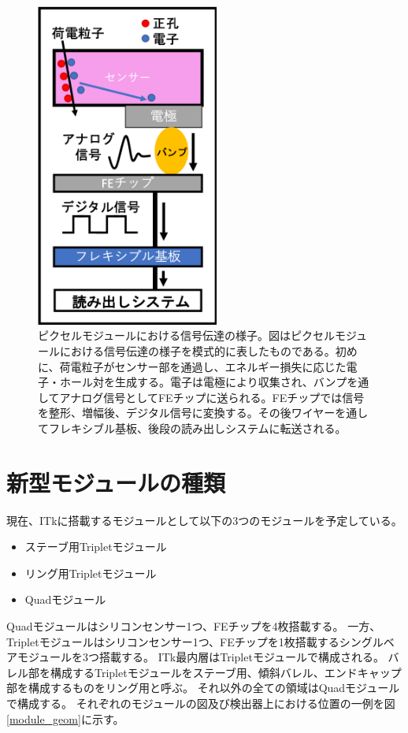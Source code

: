 \begin{figure}[bpt]\centering
\includegraphics[width=6cm]{./module_electric_overview.png}
\caption[ピクセルモジュールにおける信号伝達の様子]{ピクセルモジュールにおける信号伝達の様子。図はピクセルモジュールにおける信号伝達の様子を模式的に表したものである。初めに、荷電粒子がセンサー部を通過し、エネルギー損失に応じた電子・ホール対を生成する。電子は電極により収集され、バンプを通してアナログ信号としてFEチップに送られる。FEチップでは信号を整形、増幅後、デジタル信号に変換する。その後ワイヤーを通してフレキシブル基板、後段の読み出しシステムに転送される。}
\label{module_electric_overview}
\end{figure}

\clearpage
\section{新型モジュールの種類}
現在、ITkに搭載するモジュールとして以下の3つのモジュールを予定している。
\begin{itemize}
  \item ステーブ用Tripletモジュール
  \item リング用Tripletモジュール
  \item Quadモジュール
\end{itemize}

Quadモジュールはシリコンセンサー1つ、FEチップを4枚搭載する。
一方、Tripletモジュールはシリコンセンサー1つ、FEチップを1枚搭載するシングルベアモジュールを3つ搭載する。
ITk最内層はTripletモジュールで構成される。
バレル部を構成するTripletモジュールをステーブ用、傾斜バレル、エンドキャップ部を構成するものをリング用と呼ぶ。
それ以外の全ての領域はQuadモジュールで構成する。
それぞれのモジュールの図及び検出器上における位置の一例を図\ref{module_geom}に示す。

